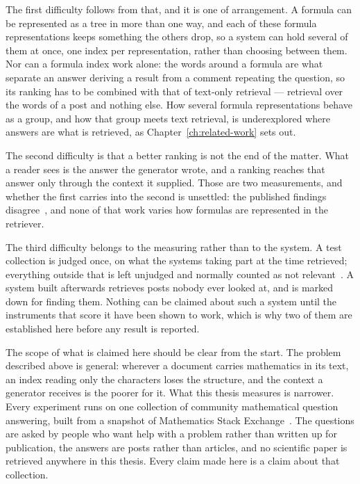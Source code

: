 The first difficulty follows from that, and it is one of arrangement. A formula can be represented
as a tree in more than one way, and each of these formula representations keeps something the others
drop, so a system can hold several of them at once, one index per representation, rather than
choosing between them. Nor can a formula index work alone: the words around a formula are what
separate an answer deriving a result from a comment repeating the question, so its ranking has to be
combined with that of text-only retrieval --- retrieval over the words of a post and nothing else.
How several formula representations behave as a group, and how that group meets text retrieval, is
underexplored where answers are what is retrieved, as Chapter~\ref{ch:related-work} sets out.

The second difficulty is that a better ranking is not the end of the matter. What a reader sees is
the answer the generator wrote, and a ranking reaches that answer only through the context it
supplied. Those are two measurements, and whether the first carries into the second is unsettled:
the published findings
disagree~\cite{salemi2024erag,henkel2024mathrag,alshammari2026mathnet}, and none of that work
varies how formulas are represented in the retriever.

The third difficulty belongs to the measuring rather than to the system. A test collection is judged
once, on what the systems taking part at the time retrieved; everything outside that is left
unjudged and normally counted as not relevant~\cite{buckley2004incomplete}. A system built
afterwards retrieves posts nobody ever looked at, and is marked down for finding them. Nothing can
be claimed about such a system until the instruments that score it have been shown to work, which is
why two of them are established here before any result is reported.

The scope of what is claimed here should be clear from the start. The problem described above is
general: wherever a document carries mathematics in its text, an index reading only the characters
loses the structure, and the context a generator receives is the poorer for it. What this thesis
measures is narrower. Every experiment runs on one collection of community mathematical question
answering, built from a snapshot of Mathematics Stack Exchange~\cite{zanibbi2020arqmath}. The
questions are asked by people who want help with a problem rather than written up for publication,
the answers are posts rather than articles, and no scientific paper is retrieved anywhere in this
thesis. Every claim made here is a claim about that collection.

